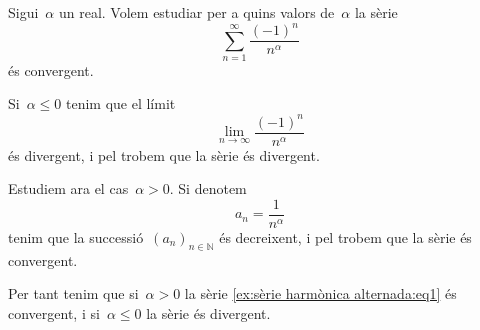 \documentclass[../../main.tex]{subfiles}
\begin{document}
    \begin{example}
        \label{ex:sèrie harmònica alternada}
        Sigui~\(\alpha\) un real.
        Volem estudiar per a quins valors de~\(\alpha\) la sèrie
        \begin{equation}
            \label{ex:sèrie harmònica alternada:eq1}
            \sum_{n=1}^{\infty}\frac{(-1)^{n}}{n^{\alpha}}
        \end{equation}
        és convergent.
    \end{example}
    \begin{solution}
        Si~\(\alpha\leq0\) tenim que el límit
        \[
            \lim_{n\to\infty}\frac{(-1)^{n}}{n^{\alpha}}
        \]
        és divergent, i pel \corollari{}  trobem que la sèrie és divergent.

        Estudiem ara el cas~\(\alpha>0\).
        Si denotem
        \[
            a_{n}=\frac{1}{n^{\alpha}}
        \]
        tenim que la successió~\((a_{n})_{n\in\mathbb{N}}\) és decreixent, i pel  trobem que la sèrie és convergent.

        Per tant tenim que si~\(\alpha>0\) la sèrie \eqref{ex:sèrie harmònica alternada:eq1} és convergent, i si~\(\alpha\leq0\) la sèrie és divergent.
    \end{solution}
\end{document}
